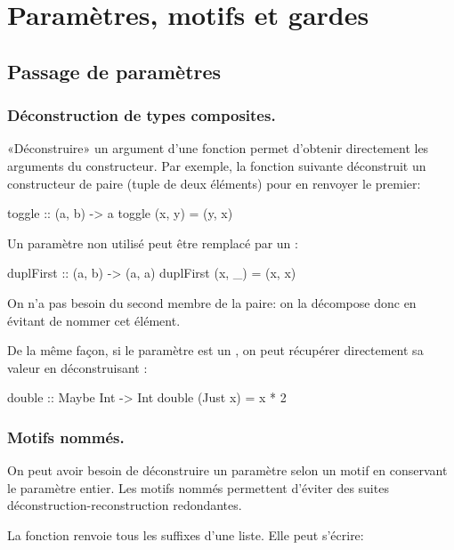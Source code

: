 \section{Paramètres, motifs et gardes}
\label{function-parameters}

\subsection{Passage de paramètres}

\todo{}

\subsubsection{Déconstruction de types composites.}

«Déconstruire» un argument d'une fonction permet d'obtenir directement les arguments du constructeur. Par exemple, la fonction suivante déconstruit un constructeur de paire (tuple de deux éléments) pour en renvoyer le premier:

\begin{haskellcode}
toggle :: (a, b) -> a
toggle (x, y) = (y, x)
\end{haskellcode}

Un paramètre non utilisé peut être remplacé par un \hs{_}:

\begin{haskellcode}
duplFirst :: (a, b) -> (a, a)
duplFirst (x, _) = (x, x)
\end{haskellcode}

On n'a pas besoin du second membre de la paire: on la décompose donc en évitant de nommer cet élément.

De la même façon, si le paramètre est un , on peut récupérer directement sa valeur en déconstruisant :

\begin{haskellcode}
double :: Maybe Int -> Int
double (Just x) = x * 2
\end{haskellcode}

\subsubsection{Motifs nommés.}
\label{as-patterns}

On peut avoir besoin de déconstruire un paramètre selon un motif en conservant le paramètre entier. Les motifs nommés permettent d'éviter des suites déconstruction-reconstruction redondantes.

La fonction  \parencite[103]{OSullivan2008} renvoie tous les suffixes d'une liste. Elle peut s'écrire:

